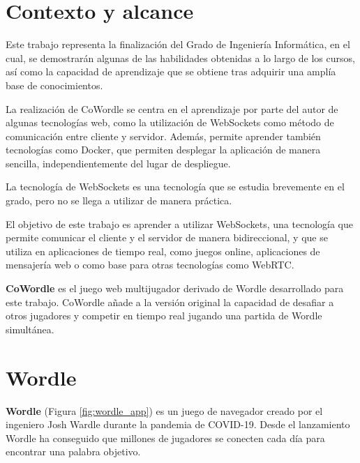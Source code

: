 \section{Contexto y alcance}

Este trabajo representa la finalización del Grado de Ingeniería Informática, en el cual, se demostrarán algunas de las habilidades obtenidas a lo largo de los cursos, así como la capacidad de aprendizaje que se obtiene tras adquirir una amplía base de conocimientos.

La realización de CoWordle se centra en el aprendizaje por parte del autor de algunas tecnologías web, como la utilización de WebSockets como método de comunicación entre cliente y servidor.  Además, permite aprender también tecnologías como Docker, que permiten desplegar la aplicación de manera sencilla, independientemente del lugar de despliegue.

La tecnología de WebSockets es una tecnología que se estudia brevemente en el grado, pero no se llega a utilizar de manera práctica.

El objetivo de este trabajo es aprender a utilizar WebSockets, una tecnología que permite comunicar el cliente y el servidor de manera bidireccional, y que se utiliza en aplicaciones de tiempo real, como juegos online, aplicaciones de mensajería web o como base para otras tecnologías como WebRTC.

\textbf{CoWordle} es el juego web multijugador derivado de Wordle desarrollado para este trabajo. CoWordle añade a la versión original la capacidad de desafiar a otros jugadores y competir en tiempo real jugando una partida de Wordle simultánea.


\section{Wordle}

\textbf{Wordle} (Figura \ref{fig:wordle_app}) es un juego de navegador creado por el ingeniero Josh Wardle durante la pandemia de COVID-19. Desde el lanzamiento Wordle ha conseguido que millones de jugadores se conecten cada día para encontrar una palabra objetivo.


